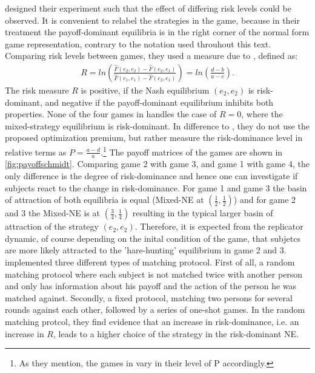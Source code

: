 \documentclass[11pt]{article}
\begin{document}
\textcite{schmidt_playing_2003} designed their experiment such that the effect
of differing risk levels could be observed. It is convenient to relabel 
the strategies in the game, because in their treatment the payoff-dominant 
equilibria is in the right corner of the normal form game representation,
contrary to the notation used throuhout this text. Comparing risk levels between
games, they used a measure due to \textcite{selten_axiomatic_1995}, defined
as:
\begin{align}
        \label{riskmeasureschmidt}
        R = ln\left(\frac{\hat{F}(e_2,e_2) -\hat{F}(e_2,e_1)}{\hat{F}(e_1,e_1) 
        -\hat{F}(e_2,e_1)}\right) = ln \left(\frac{d-b}{a-c}\right).
\end{align}
The risk measure $R$ is positive, if the Nash equilibrium $(e_2,e_2)$ is
risk-dominant, and negative if the payoff-dominant equilibrium inhibits both
properties.
None of the four games in \textcite{schmidt_playing_2003} handles
the case of $R=0$, where the mixed-strategy equilibrium is risk-dominant.
In difference to \textcite{battalio_optimization_2001}, they do not
use the proposed optimization premium, but rather measure the risk-dominance 
level in relative terms as $P=\frac{a-d}{a}$.\footnote{As they mention, the 
games in \textcite{battalio_optimization_2001} vary in their level of 
P accordingly.}
The payoff matrices of the games are shown in \ref{fig:payoffschmidt}.
Comparing game 2 with game 3, and game 1 with game 4, the 
only difference is the degree of risk-dominance and hence one can 
investigate if subjects react to the change in risk-dominance. 
For game 1 and game 3 the basin of attraction of both equilibria is equal 
(Mixed-NE at $(\frac 12, \frac 12)$) and  for
game 2 and 3 the Mixed-NE is at $(\frac 34,\frac 14)$ resulting in the 
typical  larger basin of attraction of the strategy $(e_2,e_2)$. 
Therefore, it is expected from the replicator dynamic, of course 
depending on the inital condition 
of the game, that subjetcs are more likely attracted to the 'hare-hunting' 
equilibrium in game 2 and 3.
\textcite{schmidt_playing_2003} implemented three different types of matching
protocol. First of all, a random matching protocol where each subject is not
matched twice with another person and only has information 
about his payoff and the action of the person he was matched against. 
Secondly, a fixed protocol, matching two persons for several rounds against 
each other, followed by a series of one-shot games. 
In the random matching protcol, they find evidence that an increase in 
risk-dominance, i.e. an increase in $R$, leads to a higher choice of the
strategy in the risk-dominant NE. 
\end{document}
